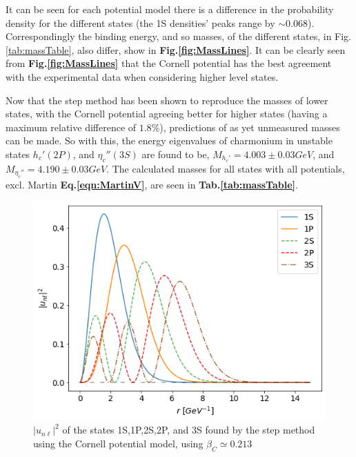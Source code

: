 \documentclass[10pt,twocolumn]{revtex4}    %
\begin{document}
It can be seen for each potential model there is a difference in the probability density for the different states (the 1S densities' peaks range by $\sim0.068$). Correspondingly the binding energy, and so masses, of the different states, in Fig.\ref{tab:massTable}, also differ, show in \textbf{Fig.\ref{fig:MassLines}}. It can be clearly seen from \textbf{Fig.\ref{fig:MassLines}} that the Cornell potential has the best agreement with the experimental data when considering higher level states.

Now that the step method has been shown to reproduce the masses of lower states, with the Cornell potential agreeing better for higher states (having a maximum relative difference of $1.8\%$), predictions of as yet unmeasured masses can be made. So with this, the energy eigenvalues of charmonium in unstable states $h_c'(2P)$, and $\eta_c''(3S)$ are found to be, $M_{h_c'} = 4.003 \pm 0.03 GeV$, and $M_{\eta_c''} = 4.190 \pm  0.03 GeV$. The calculated masses for all states with all potentials, excl. Martin \textbf{Eq.\ref{eqn:MartinV}}, are seen in \textbf{Tab.\ref{tab:massTable}}.


\begin{figure}[!t]
    \centering
    \includegraphics[width=\linewidth]{CornellSpectraLong.png}
    \caption{$|u_{n\ell}|^2$ of the states 1S,1P,2S,2P, and 3S found by the step method using the Cornell potential model, using $\beta_C \simeq 0.213$}
    \label{fig:CornellSpectra}
\end{figure}
\end{document}
